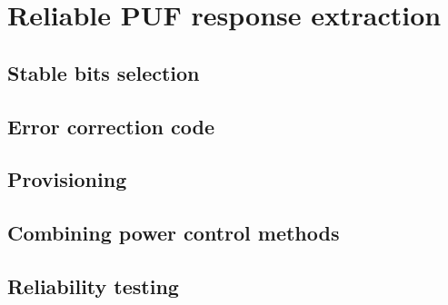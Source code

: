 \chapter{Reliable PUF response extraction}\label{sec:response_extraction} %

\section{Stable bits selection}

\section{Error correction code}\label{sec:ecc}

\section{Provisioning}

\section{Combining power control methods}

\section{Reliability testing}

